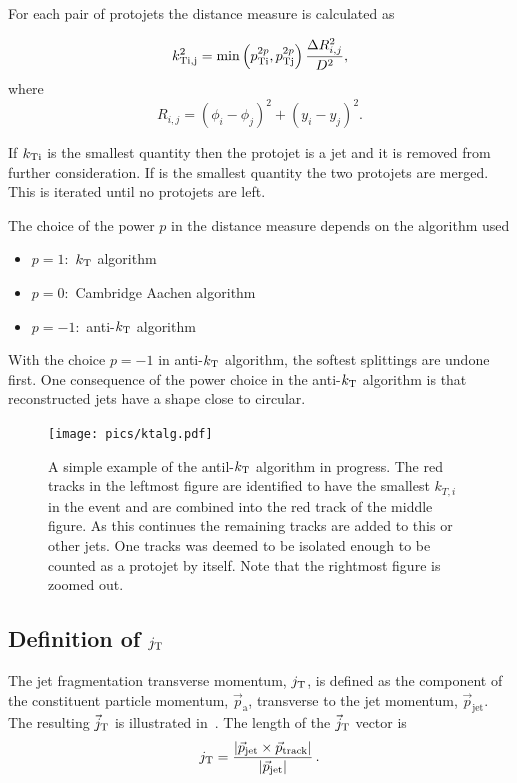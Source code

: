 \noindent For each pair of protojets the distance measure is calculated as

\begin{equation}
k_{\rm Ti,j}^{2}=\min\left(p_{\rm Ti}^{2p},p_{\rm Tj}^{2p}\right)\frac{\Delta R^2_{i,j}}{D^2},
\end{equation}
\nopagebreak
\noindent where
 \nopagebreak
 \begin{equation}
 R_{i,j}=\left(\phi_i-\phi_j\right)^2+\left(y_i-y_j\right)^2.
 \end{equation}

If $k_{\rm Ti}$ is the smallest quantity then the protojet is a jet and it is removed from further consideration. If  is the smallest quantity the two protojets are merged. This is iterated until no protojets are left.

The choice of the power $p$ in the distance measure depends on the algorithm used
\begin{itemize}
\item $p=1$:~$k_{\rm T}$ algorithm
\item $p=0$:~Cambridge Aachen algorithm
\item $p=-1$:~anti-$k_{\rm T}$ algorithm
\end{itemize}

With the choice $p=-1$ in anti-$k_{\rm T}$ algorithm, the softest splittings are undone first. One consequence of the power choice in the anti-$k_{\rm T}$ algorithm is that reconstructed jets have a shape close to circular.
   \begin{figure}
\centering
\texttt{[image: pics/ktalg.pdf]}
    \caption{A simple example of the antil-$k_{\rm T}$ algorithm in progress. The red tracks in the leftmost figure are identified to have the smallest $k_{T,i}$ in the event and are combined into the red track of the middle figure. As this continues the remaining tracks are added to this or other jets. One tracks was deemed to be isolated enough to be counted as a protojet by itself. Note that the rightmost figure is zoomed out.}
    \label{fig:ktalg}
  \end{figure}

\subsection{Definition of $j_{\rm T}$ }
The jet fragmentation transverse momentum, $j_{\rm T}$, is defined as the component of the constituent particle momentum, $\vec{p}_{\mathrm{a}}$, transverse to the jet momentum, $\vec{p}_{\mathrm{jet}}$. The resulting $\vec{j}_{\rm T}$ is illustrated in~. The length of the $\vec{j}_{\rm T}$ vector is
  \begin{equation}
    j_{\rm T} = \frac{|\vec{p}_{\mathrm{jet}} \times \vec{p}_{\mathrm{track}}|}{|\vec{p}_{\mathrm{jet}}|} \,.
  \label{eq:jtdefinition}
  \end{equation}

